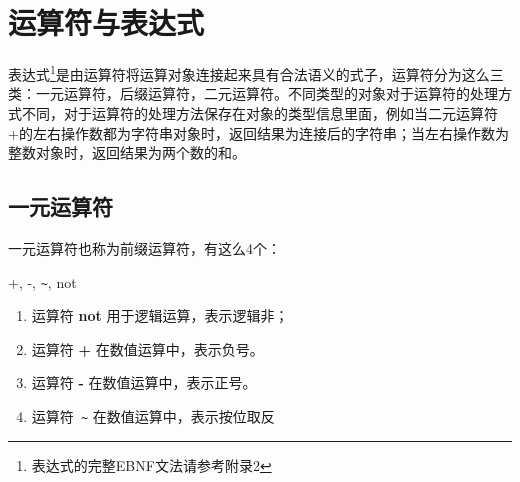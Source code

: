 \section{运算符与表达式}
表达式\footnote{表达式的完整EBNF文法请参考附录2}是由运算符将运算对象连接起来具有合法语义的式子，运算符分为这么三类：一元运算符，后缀运算符，二元运算符。不同类型的对象对于运算符的处理方式不同，对于运算符的处理方法保存在对象的类型信息里面，例如当二元运算符+的左右操作数都为字符串对象时，返回结果为连接后的字符串；当左右操作数为整数对象时，返回结果为两个数的和。

\subsection{一元运算符}
一元运算符也称为前缀运算符，有这么4个：\begin{textbf}+, -, \verb|~|, not\end{textbf}
\begin{enumerate}
\item 运算符\textbf{ not} 用于逻辑运算，表示逻辑非；
\item 运算符\textbf{ +} 在数值运算中，表示负号。
\item 运算符\textbf{ -} 在数值运算中，表示正号。
\item 运算符\verb| ~| 在数值运算中，表示按位取反
\end{enumerate}
